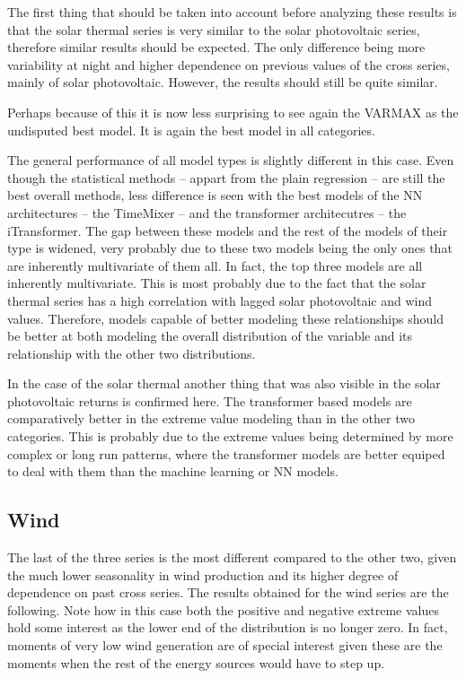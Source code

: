The first thing that should be taken into account before analyzing these results is that the solar thermal series is very similar to the solar photovoltaic series, therefore similar results should be expected. The only difference being more variability at night and higher dependence on previous values of the cross series, mainly of solar photovoltaic. However, the results should still be quite similar.

Perhaps because of this it is now less surprising to see again the VARMAX as the undisputed best model. It is again the best model in all categories. 

The general performance of all model types is slightly different in this case. Even though the statistical methods -- appart from the plain regression -- are still the best overall methods, less difference is seen with the best models of the NN architectures -- the TimeMixer -- and the transformer architecutres -- the iTransformer. The gap between these models and the rest of the models of their type is widened, very probably due to these two models being the only ones that are inherently multivariate of them all. In fact, the top three models are all inherently multivariate. This is most probably due to the fact that the solar thermal series has a high correlation with lagged solar photovoltaic and wind values. Therefore, models capable of better modeling these relationships should be better at both modeling the overall distribution of the variable and its relationship with the other two distributions. 

In the case of the solar thermal another thing that was also visible in the solar photovoltaic returns is confirmed here. The transformer based models are comparatively better in the extreme value modeling than in the other two categories. This is probably due to the extreme values being determined by more complex or long run patterns, where the transformer models are better equiped to deal with them than the machine learning or NN models. 

\subsection{Wind}
The last of the three series is the most different compared to the other two, given the much lower seasonality in wind production and its higher degree of dependence on past cross series. The results obtained for the wind series are the following. Note how in this case both the positive and negative extreme values hold some interest as the lower end of the distribution is no longer zero. In fact, moments of very low wind generation are of special interest given these are the moments when the rest of the energy sources would have to step up.  

